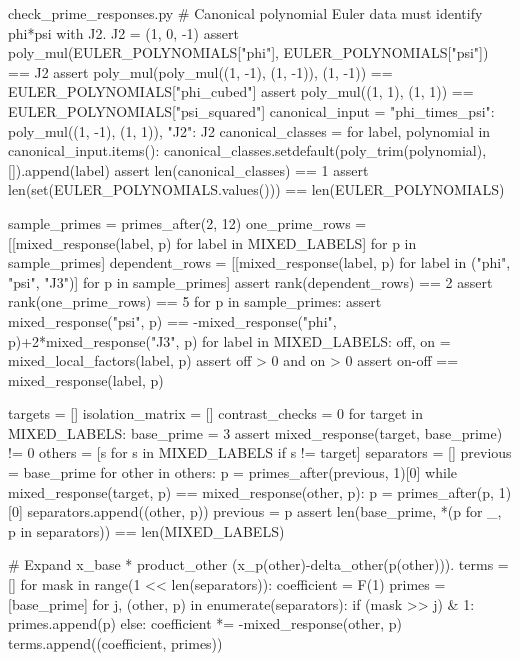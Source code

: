 \begin{filecontents*}[overwrite]{check_prime_responses.py}
    # Canonical polynomial Euler data must identify phi*psi with J2.
    J2 = (1, 0, -1)
    assert poly_mul(EULER_POLYNOMIALS["phi"], EULER_POLYNOMIALS["psi"]) == J2
    assert poly_mul(poly_mul((1, -1), (1, -1)), (1, -1)) == EULER_POLYNOMIALS["phi_cubed"]
    assert poly_mul((1, 1), (1, 1)) == EULER_POLYNOMIALS["psi_squared"]
    canonical_input = {"phi_times_psi": poly_mul((1, -1), (1, 1)), "J2": J2}
    canonical_classes = {}
    for label, polynomial in canonical_input.items():
        canonical_classes.setdefault(poly_trim(polynomial), []).append(label)
    assert len(canonical_classes) == 1
    assert len(set(EULER_POLYNOMIALS.values())) == len(EULER_POLYNOMIALS)

    sample_primes = primes_after(2, 12)
    one_prime_rows = [[mixed_response(label, p) for label in MIXED_LABELS]
                      for p in sample_primes]
    dependent_rows = [[mixed_response(label, p) for label in ("phi", "psi", "J3")]
                      for p in sample_primes]
    assert rank(dependent_rows) == 2
    assert rank(one_prime_rows) == 5
    for p in sample_primes:
        assert mixed_response("psi", p) == -mixed_response("phi", p)+2*mixed_response("J3", p)
        for label in MIXED_LABELS:
            off, on = mixed_local_factors(label, p)
            assert off > 0 and on > 0
            assert on-off == mixed_response(label, p)

    targets = []
    isolation_matrix = []
    contrast_checks = 0
    for target in MIXED_LABELS:
        base_prime = 3
        assert mixed_response(target, base_prime) != 0
        others = [s for s in MIXED_LABELS if s != target]
        separators = []
        previous = base_prime
        for other in others:
            p = primes_after(previous, 1)[0]
            while mixed_response(target, p) == mixed_response(other, p):
                p = primes_after(p, 1)[0]
            separators.append((other, p))
            previous = p
        assert len({base_prime, *(p for _, p in separators)}) == len(MIXED_LABELS)

        # Expand x_base * product_other (x_p(other)-delta_other(p(other))).
        terms = []
        for mask in range(1 << len(separators)):
            coefficient = F(1)
            primes = [base_prime]
            for j, (other, p) in enumerate(separators):
                if (mask >> j) & 1:
                    primes.append(p)
                else:
                    coefficient *= -mixed_response(other, p)
            terms.append((coefficient, primes))


\end{filecontents*}
